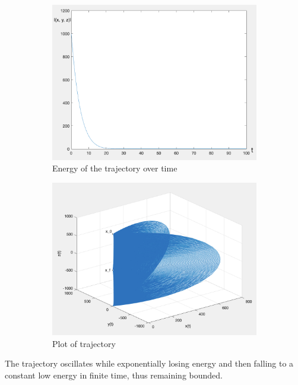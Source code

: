 \documentclass[11pt]{article}
\begin{document}
\begin{figure}[h!]
\centering
\begin{subfigure}{.5\textwidth}
  \centering
  \includegraphics[width=0.9\linewidth]{energy.png}
  \caption{Energy of the trajectory over time}
  \label{fig:sub1}
\end{subfigure}%
\begin{subfigure}{.5\textwidth}
  \centering
  \includegraphics[width=0.9\linewidth]{stable}
  \caption{Plot of trajectory}
  \label{fig:sub2}
\end{subfigure}
\caption{}
\label{fig:test}
\end{figure}

The trajectory oscillates while exponentially losing energy and then falling to a constant low energy in finite time, thus remaining bounded. 
\end{document}
